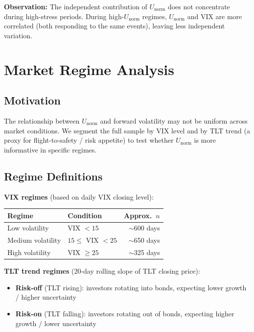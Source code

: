 \documentclass[preprint,12pt]{elsarticle}
\begin{document}
\textbf{Observation:} The independent contribution of $U_\mathrm{norm}$ does not concentrate during high-stress periods. During high-$U_\mathrm{norm}$ regimes, $U_\mathrm{norm}$ and VIX are more correlated (both responding to the same events), leaving less independent variation.

\section{Market Regime Analysis}

\subsection{Motivation}

The relationship between $U_\mathrm{norm}$ and forward volatility may not be uniform across market conditions. We segment the full sample by VIX level and by TLT trend (a proxy for flight-to-safety / risk appetite) to test whether $U_\mathrm{norm}$ is more informative in specific regimes.

\subsection{Regime Definitions}

\textbf{VIX regimes} (based on daily VIX closing level):
\begin{table}[htbp]
\centering
\begin{tabular}{llr}
\toprule
Regime & Condition & Approx.\ $n$ \\
\midrule
Low volatility    & VIX $< 15$  & $\sim$600 days \\
Medium volatility & $15 \leq$ VIX $< 25$ & $\sim$650 days \\
High volatility   & VIX $\geq 25$ & $\sim$325 days \\
\bottomrule
\end{tabular}
\end{table}

\textbf{TLT trend regimes} (20-day rolling slope of TLT closing price):
\begin{itemize}
    \item \textbf{Risk-off} (TLT rising): investors rotating into bonds, expecting lower growth / higher uncertainty
    \item \textbf{Risk-on} (TLT falling): investors rotating out of bonds, expecting higher growth / lower uncertainty
\end{itemize}
\end{document}
